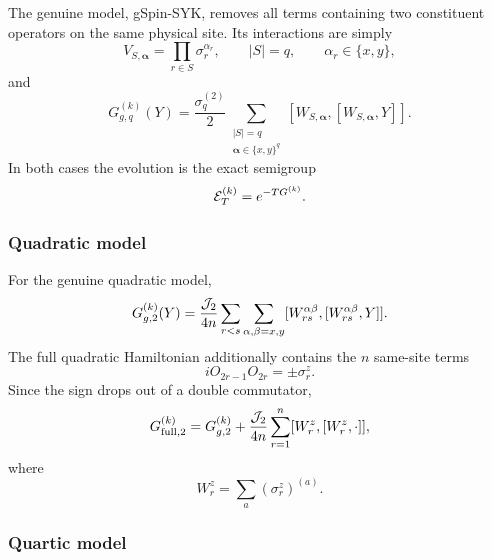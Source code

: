 \documentclass{article}
\theoremstyle{definition}
\begin{document}
The genuine model, gSpin-SYK, removes all terms containing two constituent
operators on the same physical site.  Its interactions are simply
\begin{equation}
    V_{S,\boldsymbol\alpha}
    =
    \prod_{r\in S}\sigma_r^{\alpha_r},
    \qquad
    |S|=q,
    \qquad
    \alpha_r\in\{x,y\},
    \label{eq:spinbrown_BDN_genuine_V}
\end{equation}
and
\begin{equation}
    \boxed{
    G_{g,q}^{(k)}(Y)
    =
    \frac{\sigma_q^{(2)}}{2}
    \sum_{\substack{|S|=q\\
                    \boldsymbol\alpha\in\{x,y\}^q}}
    [W_{S,\boldsymbol\alpha},
     [W_{S,\boldsymbol\alpha},Y]] .
    }
    \label{eq:spinbrown_BDN_genuine_G}
\end{equation}
In both cases the evolution is the exact semigroup
\begin{equation}
    {\cal E}_{T}^{(k)}
    =
    e^{-T G^{(k)}}.
\end{equation}


\subsubsection{Quadratic model}

For the genuine quadratic model,
\begin{equation}
    G_{g,2}^{(k)}(Y)
    =
    \frac{{\cal J}_2}{4n}
    \sum_{r<s}
    \sum_{\alpha,\beta=x,y}
    [W_{rs}^{\alpha\beta},
     [W_{rs}^{\alpha\beta},Y]].
    \label{eq:spinbrown_BDN_q2_genuine}
\end{equation}
The full quadratic Hamiltonian additionally contains the $n$ same-site
terms
\begin{equation}
    iO_{2r-1}O_{2r}
    =
    \pm\sigma_r^z.
\end{equation}
Since the sign drops out of a double commutator,
\begin{equation}
    G_{{\rm full},2}^{(k)}
    =
    G_{g,2}^{(k)}
    +
    \frac{{\cal J}_2}{4n}
    \sum_{r=1}^n
    [W_r^z,[W_r^z,\cdot]],
    \label{eq:spinbrown_BDN_q2_full}
\end{equation}
where
\begin{equation}
    W_r^z=\sum_a(\sigma_r^z)^{(a)}.
\end{equation}


\subsubsection{Quartic model}
\end{document}
